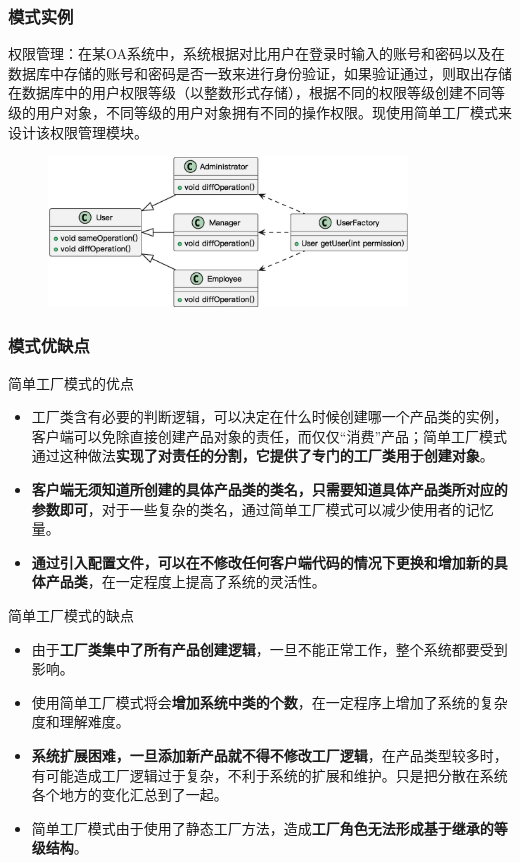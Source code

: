 \subsubsection{模式实例}
权限管理：在某OA系统中，系统根据对比用户在登录时输入的账号和密码以及在数据库中存储的账号和密码是否一致来进行身份验证，如果验证通过，则取出存储在数据库中的用户权限等级（以整数形式存储），根据不同的权限等级创建不同等级的用户对象，不同等级的用户对象拥有不同的操作权限。现使用简单工厂模式来设计该权限管理模块。
\begin{figure}[H]
    \vspace{-0.5em}
	\centering
	\includegraphics[width=0.85\textwidth]{images/简单工厂模式实例.eps}
    \vspace{-1em}
\end{figure}

\subsubsection{模式优缺点}
简单工厂模式的优点
\begin{itemize}
    \item 工厂类含有必要的判断逻辑，可以决定在什么时候创建哪一个产品类的实例，客户端可以免除直接创建产品对象的责任，而仅仅“消费”产品；简单工厂模式通过这种做法\textbf{实现了对责任的分割，它提供了专门的工厂类用于创建对象}。
    \item \textbf{客户端无须知道所创建的具体产品类的类名，只需要知道具体产品类所对应的参数即可}，对于一些复杂的类名，通过简单工厂模式可以减少使用者的记忆量。
    \item \textbf{通过引入配置文件，可以在不修改任何客户端代码的情况下更换和增加新的具体产品类}，在一定程度上提高了系统的灵活性。
\end{itemize}
简单工厂模式的缺点
\begin{itemize}
    \item 由于\textbf{工厂类集中了所有产品创建逻辑}，一旦不能正常工作，整个系统都要受到影响。
    \item 使用简单工厂模式将会\textbf{增加系统中类的个数}，在一定程序上增加了系统的复杂度和理解难度。
    \item \textbf{系统扩展困难，一旦添加新产品就不得不修改工厂逻辑}，在产品类型较多时，有可能造成工厂逻辑过于复杂，不利于系统的扩展和维护。只是把分散在系统各个地方的变化汇总到了一起。
    \item 简单工厂模式由于使用了静态工厂方法，造成\textbf{工厂角色无法形成基于继承的等级结构}。
\end{itemize}

